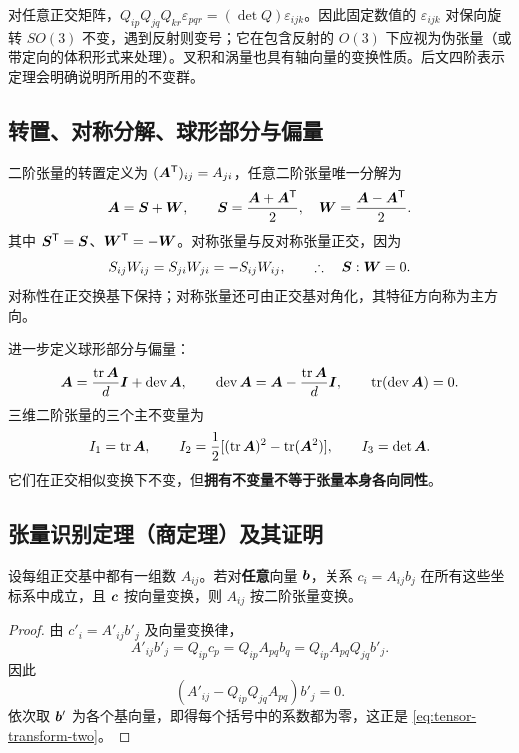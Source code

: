\begin{warningbox}
对任意正交矩阵，$Q_{ip}Q_{jq}Q_{kr}\varepsilon_{pqr}=(\det Q)\varepsilon_{ijk}$。因此固定数值的 $\varepsilon_{ijk}$ 对保向旋转 $SO(3)$ 不变，遇到反射则变号；它在包含反射的 $O(3)$ 下应视为伪张量（或带定向的体积形式来处理）。叉积和涡量也具有轴向量的变换性质。后文四阶表示定理会明确说明所用的不变群。
\end{warningbox}

\subsection{转置、对称分解、球形部分与偏量}

二阶张量的转置定义为 $(\bm{A}^{\mathsf T})_{ij}=A_{ji}$，任意二阶张量唯一分解为
\begin{equation}
 \bm{A}=\bm{S}+\bm{W},\qquad
 \bm{S}=\frac{\bm{A}+\bm{A}^{\mathsf T}}2,\quad
 \bm{W}=\frac{\bm{A}-\bm{A}^{\mathsf T}}2.
\end{equation}
其中 $\bm{S}^{\mathsf T}=\bm{S}$、$\bm{W}^{\mathsf T}=-\bm{W}$。对称张量与反对称张量正交，因为
\begin{equation}
 S_{ij}W_{ij}=S_{ji}W_{ji}=-S_{ij}W_{ij},
 \qquad\therefore\quad \bm{S}:\bm{W}=0.
\end{equation}
对称性在正交换基下保持；对称张量还可由正交基对角化，其特征方向称为主方向。

进一步定义球形部分与偏量：
\begin{equation}
 \bm{A}=\frac{\operatorname{tr}\bm{A}}{d}\bm{I}+\operatorname{dev}\bm{A},\qquad
 \operatorname{dev}\bm{A}=\bm{A}-\frac{\operatorname{tr}\bm{A}}{d}\bm{I},
 \qquad\operatorname{tr}(\operatorname{dev}\bm{A})=0.
\end{equation}
三维二阶张量的三个主不变量为
\begin{equation}
 I_1=\operatorname{tr}\bm{A},\qquad
 I_2=\frac12[(\operatorname{tr}\bm{A})^2-\operatorname{tr}(\bm{A}^2)],\qquad
 I_3=\det\bm{A}.
\end{equation}
它们在正交相似变换下不变，但\textbf{拥有不变量不等于张量本身各向同性}。

\subsection{张量识别定理（商定理）及其证明}\label{subsec:tensor-quotient}

\begin{theorem}[二阶张量的识别]
设每组正交基中都有一组数 $A_{ij}$。若对\textbf{任意}向量 $\bm{b}$，关系 $c_i=A_{ij}b_j$ 在所有这些坐标系中成立，且 $\bm{c}$ 按向量变换，则 $A_{ij}$ 按二阶张量变换。
\end{theorem}
\begin{proof}
由 $c'_i=A'_{ij}b'_j$ 及向量变换律，
\begin{equation}
 A'_{ij}b'_j=Q_{ip}c_p
 =Q_{ip}A_{pq}b_q
 =Q_{ip}A_{pq}Q_{jq}b'_j.
\end{equation}
因此
\begin{equation}
 (A'_{ij}-Q_{ip}Q_{jq}A_{pq})b'_j=0.
\end{equation}
依次取 $\bm{b}'$ 为各个基向量，即得每个括号中的系数都为零，这正是 \eqref{eq:tensor-transform-two}。
\end{proof}

